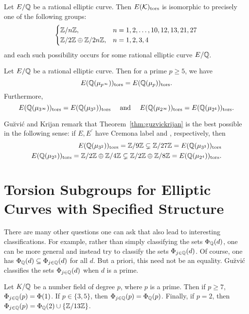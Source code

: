 \begin{thm}
Let $E/\mathbb{Q}$ be a rational elliptic curve. Then $E(\mathcal{K})_{\text{tors}}$ is isomorphic to precisely one of the following groups:
	\[
	\begin{cases}
	\mathbb{Z}/n\mathbb{Z}, & n= 1, 2, \ldots, 10, 12, 13, 21, 27 \\
	\mathbb{Z}/2\mathbb{Z} \oplus \mathbb{Z}/2n\mathbb{Z}, & n= 1, 2, 3, 4
	\end{cases}
	\]
and each such possibility occurs for some rational elliptic curve $E/\mathbb{Q}$.
\end{thm}


\begin{thm} \label{thm:guzvickrijan}
Let $E/\mathbb{Q}$ be a rational elliptic curve. Then for a prime $p \geq 5$, we have
	\[
	E(\mathbb{Q}(\mu_{p^\infty}))_{\text{tors}}= E(\mathbb{Q}(\mu_p))_{\text{tors}}.
	\]
Furthermore,
	\[
	E(\mathbb{Q}(\mu_{3^\infty}))_{\text{tors}}= E(\mathbb{Q}(\mu_{3^3}))_{\text{tors}} \quad \text{ and } \quad E(\mathbb{Q}(\mu_{2^\infty}))_{\text{tors}}= E(\mathbb{Q}(\mu_{2^4}))_{\text{tors}}.
	\]
\end{thm}


Gu{\u{z}}vi\'c and Krijan remark that Theorem~\ref{thm:guzvickrijan} is the best possible in the following sense: if $E, E^\prime$ have Cremona label \tsaf{} and \ttaf{}, respectively, then
	\[
	\begin{aligned}
	E(\mathbb{Q}(\mu_{3^2}))_{\text{tors}}= \mathbb{Z}/9\mathbb{Z} \subsetneq \mathbb{Z}/27\mathbb{Z}= E(\mathbb{Q}(\mu_{3^3}))_{\text{tors}} \\
	E(\mathbb{Q}(\mu_{2^3}))_{\text{tors}}= \mathbb{Z}/2\mathbb{Z} \oplus \mathbb{Z}/4\mathbb{Z} \subsetneq \mathbb{Z}/2\mathbb{Z} \oplus \mathbb{Z}/8\mathbb{Z}= E(\mathbb{Q}(\mu_{2^4}))_{\text{tors}}. 
	\end{aligned}
	\]





\section{Torsion Subgroups for Elliptic Curves with Specified Structure}

There are many other questions one can ask that also lead to interesting classifications. For example, rather than simply classifying the sets $\Phi_{\mathbb{Q}}(d)$, one can be more general and instead try to classify the sets $\Phi_{j \in \mathbb{Q}}(d)$. Of course, one has $\Phi_{\mathbb{Q}}(d) \subseteq \Phi_{j \in \mathbb{Q}}(d)$ for all $d$. But a priori, this need not be an equality. Gu{\u{z}}vi\'c classifies the sets $\Phi_{j \in \mathbb{Q}}(d)$ when $d$ is a prime. 


\begin{thm}
Let $K/\mathbb{Q}$ be a number field of degree $p$, where $p$ is a prime. Then if $p \geq 7$, $\Phi_{j \in \mathbb{Q}}(p)= \Phi(1)$. If $p \in \{ 3, 5 \}$, then $\Phi_{j \in \mathbb{Q}}(p)= \Phi_{\mathbb{Q}}(p)$. Finally, if $p= 2$, then $\Phi_{j \in \mathbb{Q}}(p)= \Phi_{\mathbb{Q}}(2) \cup \{ \mathbb{Z}/13\mathbb{Z} \}$. 
\end{thm}


